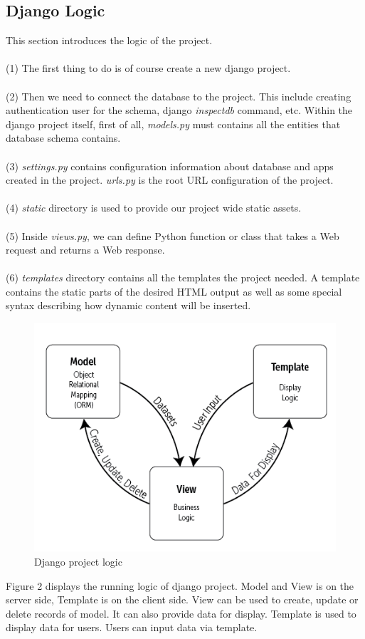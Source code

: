 \documentclass[12pt]{article}
\begin{document}
	\subsection{Django Logic}\par
	This section introduces the logic of the project. \\\\
	(1) The first thing to do is of course create a new django project.\\\\
	(2) Then we need to connect the database to the project. This include creating authentication user for the schema, django \textit{inspectdb} command, etc. Within the django project itself, first of all, \textit{models.py} must contains all the entities that database schema contains. \\\\
	(3) \textit{settings.py} contains configuration information about database and apps created in the project. \textit{urls.py} is the root URL configuration of the project.\\\\
	(4) \textit{static} directory is used to provide our project wide static assets. \\\\
	(5) Inside \textit{views.py}, we can define Python function or class that takes a Web request and returns a Web response. \\\\
	(6) \textit{templates} directory contains all the templates the project needed. A template contains the static parts of the desired HTML output as well as some special syntax describing how dynamic content will be inserted.
	\begin{figure}[H]
		\centering
		\includegraphics[scale=0.7]{django}
		\caption{Django project logic}
	\end{figure}
	Figure 2 displays the running logic of django project. Model and View is on the server side, Template is on the client side. View can be used to create, update or delete records of model. It can also provide data for display. Template is used to display data for users. Users can input data via template.
	
\end{document}

